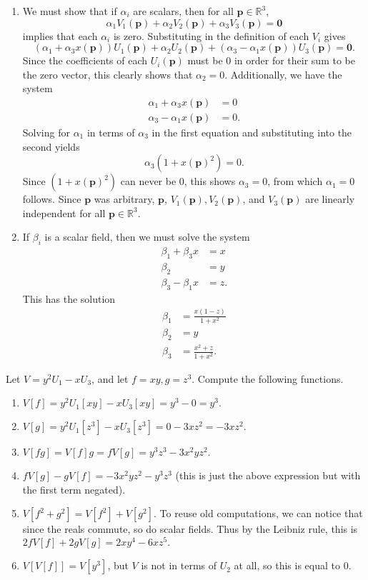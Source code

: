 \documentclass[10pt]{report}
\begin{document}
\begin{enumerate}
	\item We must show that if $\alpha_i$ are scalars, then for all $\mathbf{p} \in \mathbb{R}^3$,
		\[
			\alpha_1V_1(\mathbf{p})+\alpha_2V_2(\mathbf{p})+\alpha_3V_3(\mathbf{p}) = \mathbf{0}
		\] implies that each $\alpha_i$ is zero. Substituting in the definition of each $V_i$ gives
		\[
			(\alpha_1+\alpha_3x(\mathbf{p}))U_1(\mathbf{p}) + \alpha_2U_2(\mathbf{p})+(\alpha_3-\alpha_1x(\mathbf{p}))U_3(\mathbf{p}) = \mathbf{0}.
		\] Since the coefficients of each $U_i(\mathbf{p})$ must be 0 in order for their sum to be the zero vector, this clearly shows that $\alpha_2=0$. Additionally, we have the system
		\begin{align*}
			\alpha_1+\alpha_3x(\mathbf{p}) &= 0 \\
			\alpha_3-\alpha_1x(\mathbf{p}) &= 0.
		\end{align*}
		Solving for $\alpha_1$ in terms of $\alpha_3$ in the first equation and substituting into the second yields
		\[
			\alpha_3(1+x(\mathbf{p})^2) = 0.
		\] Since $(1+x(\mathbf{p})^2)$ can never be 0, this shows $\alpha_3=0$, from which $\alpha_1=0$ follows. Since $\mathbf{p}$ was arbitrary, $\mathbf{p}$, $V_1(\mathbf{p}), V_2(\mathbf{p})$, and $V_3(\mathbf{p})$ are linearly independent for all $\mathbf{p} \in \mathbb{R}^3$.

	\item If $\beta_i$ is a scalar field, then we must solve the system
		\begin{align*}
			\beta_1+\beta_3x &= x \\
			\beta_2 &= y \\
			\beta_3 - \beta_1x &= z.
		\end{align*}
		This has the solution
		\begin{align*}
			\beta_1 &= \frac{x(1-z)}{1+x^2} \\
			\beta_2 &= y \\
			\beta_3 &= \frac{x^2+z}{1+x^2}.
		\end{align*}
\end{enumerate}

\begin{exer}[1.3.3]
	Let $V=y^2U_1-xU_3$, and let $f=xy,g=z^3$. Compute the following functions.
\end{exer}
\begin{enumerate}
	\item $V[f] = y^2 U_1[xy] - xU_3[xy] = y^3 - 0 = y^3.$
	\item $V[g] = y^2 U_1[z^3] - xU_3[z^3] = 0 - 3xz^2 = -3xz^2.$
	\item $V[fg] = V[f]g = fV[g] = y^3z^3 - 3x^2yz^2.$
	\item $fV[g] - gV[f] = -3x^2yz^2 - y^3z^3$ (this is just the above expression but with the first term negated).
	\item $V[f^2+g^2] = V[f^2]+V[g^2]$. To reuse old computations, we can notice that since the reals commute, so do scalar fields. Thus by the Leibniz rule, this is $2fV[f] + 2gV[g] = 2xy^4 - 6xz^5.$ 
	\item $V[V[f]] = V[y^3]$, but $V$ is not in terms of $U_2$ at all, so this is equal to 0.
\end{enumerate}
\end{document}
